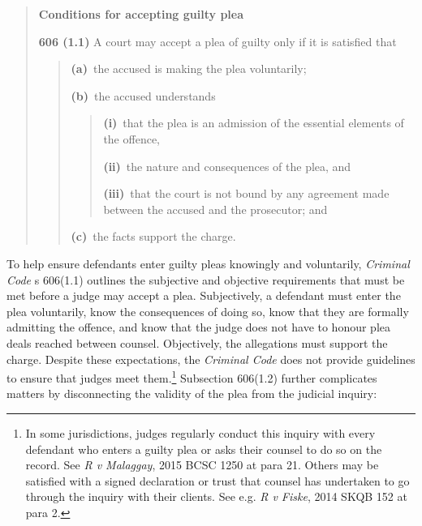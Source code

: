 \break
\begin{quote}
    \singlespacing
    \textbf{Conditions for accepting guilty plea}
    
    \textbf{606 (1.1)} A court may accept a plea of guilty only if it is satisfied that

    \begin{quote}
        \textbf{(a)} the accused is making the plea voluntarily;
        
        \textbf{(b)} the accused understands
        \begin{quote}
            \textbf{(i)} that the plea is an admission of the essential elements of the offence,
            
            \textbf{(ii)} the nature and consequences of the plea, and
            
            \textbf{(iii)} that the court is not bound by any agreement made between the accused and the prosecutor; and   
        \end{quote}
        \textbf{(c)} the facts support the charge.
    \end{quote}

\end{quote}
To help ensure defendants enter guilty pleas knowingly and voluntarily, \textit{Criminal Code} s 606(1.1) outlines the subjective and objective requirements that must be met before a judge may accept a plea. Subjectively, a defendant must enter the plea voluntarily, know the consequences of doing so, know that they are formally admitting the offence, and know that the judge does not have to honour plea deals reached between counsel. Objectively, the allegations must support the charge. Despite these expectations, the \textit{Criminal Code} does not provide guidelines to ensure that judges meet them.\footnote{In some jurisdictions, judges regularly conduct this inquiry with every defendant who enters a guilty plea or asks their counsel to do so on the record. See \textit{R v Malaggay}, 2015 BCSC 1250 at para 21. Others may be satisfied with a signed declaration or trust that counsel has undertaken to go through the inquiry with their clients. See e.g. \textit{R v Fiske}, 2014 SKQB 152 at para 2.} Subsection 606(1.2) further complicates matters by disconnecting the validity of the plea from the judicial inquiry:

